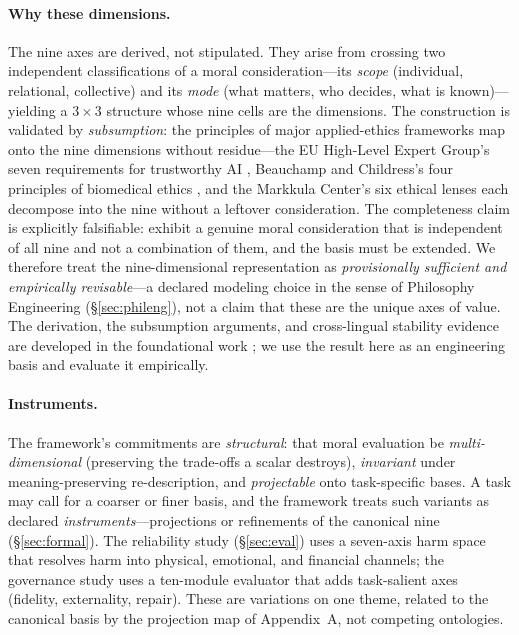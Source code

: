 \paragraph{Why these dimensions.}
The nine axes are derived, not stipulated. They arise from crossing two independent
classifications of a moral consideration---its \emph{scope} (individual, relational,
collective) and its \emph{mode} (what matters, who decides, what is known)---yielding a
$3\times 3$ structure whose nine cells are the dimensions. The construction is validated by
\emph{subsumption}: the principles of major applied-ethics frameworks map onto the nine
dimensions without residue---the EU High-Level Expert Group's seven requirements for
trustworthy AI \citep{euhleg2019}, Beauchamp and Childress's four principles of biomedical
ethics \citep{beauchamp2019}, and the Markkula Center's six ethical lenses \citep{markkula}
each decompose into the nine without a leftover consideration. The completeness claim is explicitly falsifiable: exhibit a genuine moral
consideration that is independent of all nine and not a combination of them, and the basis
must be extended. We therefore treat the nine-dimensional representation as
\emph{provisionally sufficient and empirically revisable}---a declared modeling choice in the
sense of Philosophy Engineering (\S\ref{sec:phileng}), not a claim that these are the unique
axes of value. The derivation, the subsumption arguments, and cross-lingual stability
evidence are developed in the foundational work \citep{bond_geometric_ethics}; we use the
result here as an engineering basis and evaluate it empirically.

\paragraph{Instruments.}
The framework's commitments are \emph{structural}: that moral evaluation be
\emph{multi-dimensional} (preserving the trade-offs a scalar destroys), \emph{invariant}
under meaning-preserving re-description, and \emph{projectable} onto task-specific bases. A
task may call for a coarser or finer basis, and the framework treats such variants as
declared \emph{instruments}---projections or refinements of the canonical nine
(\S\ref{sec:formal}). The reliability study (\S\ref{sec:eval}) uses a seven-axis harm space
that resolves harm into physical, emotional, and financial channels; the governance study
uses a ten-module evaluator that adds task-salient axes (fidelity, externality, repair).
These are variations on one theme, related to the canonical basis by the projection map of
Appendix~A, not competing ontologies.

